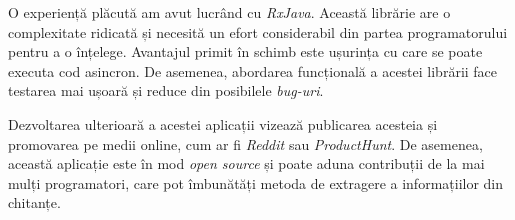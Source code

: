 O experiență plăcută am avut lucrând cu \emph{RxJava}. Această librărie are o complexitate ridicată și necesită un efort considerabil din partea programatorului pentru a o înțelege. Avantajul primit în schimb este ușurința cu care se poate executa cod asincron. De asemenea, abordarea funcțională a acestei librării face testarea mai ușoară și reduce din posibilele \emph{bug-uri}.

Dezvoltarea ulterioară a acestei aplicații vizează publicarea acesteia și promovarea pe medii online, cum ar fi \emph{Reddit} sau \emph{ProductHunt}. De asemenea, această aplicație este în mod \emph{open source} și poate aduna contribuții de la mai mulți programatori, care pot îmbunătăți metoda de extragere a informațiilor din chitanțe.
